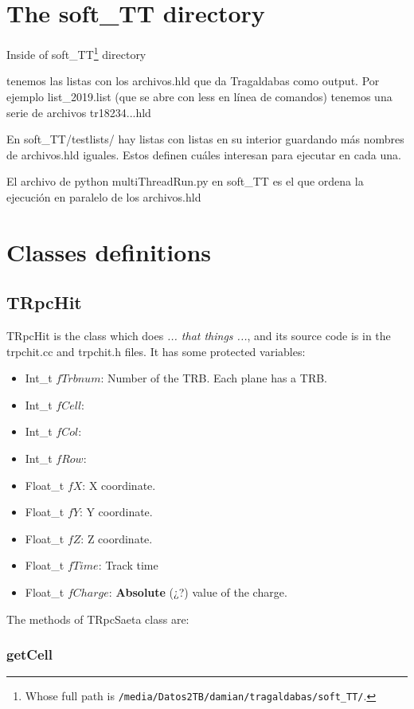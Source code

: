 \documentclass[a4paper]{book}
\begin{document}
\section{The soft\_TT directory}

Inside of soft\_TT\footnote{Whose full path is \texttt{/media/Datos2TB/damian/tragaldabas/soft\_TT/}.} directory

tenemos las listas con los archivos.hld que da Tragaldabas como output. Por ejemplo list\_2019.list (que se abre con less en línea de comandos) tenemos una serie de archivos tr18234...hld

En soft\_TT/testlists/ hay listas con listas en su interior guardando más nombres de archivos.hld iguales. Estos definen cuáles interesan para ejecutar en cada una.

El archivo de python multiThreadRun.py en soft\_TT es el que ordena la ejecución en paralelo de los archivos.hld

\section{Classes definitions}

\subsection{TRpcHit}

TRpcHit is the class which does \textit{... that things ...}, and its source code is in the trpchit.cc and trpchit.h files. It has some protected variables:

\begin{itemize}
    \item Int\_t $fTrbnum$: Number of the TRB. Each plane has a TRB.
    \item Int\_t $fCell$: 
    \item Int\_t $fCol$: 
    \item Int\_t $fRow$: 
    \item Float\_t $fX$: X coordinate.
    \item Float\_t $fY$: Y coordinate.
    \item Float\_t $fZ$: Z coordinate.
    \item Float\_t $fTime$: Track time
    \item Float\_t $fCharge$: \textbf{Absolute} (¿?) value of the charge.
\end{itemize}

The methods of TRpcSaeta class are:

\subsubsection{getCell}
\end{document}
